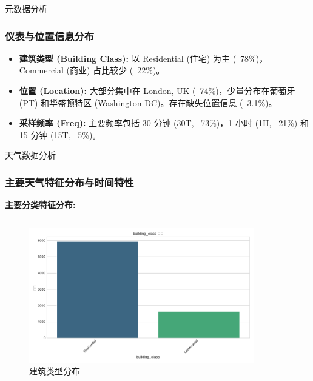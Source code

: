 \documentclass{beamer} %
\begin{document}
\begin{frame}{元数据分析}
    \frametitle{仪表与位置信息分布}
    \begin{itemize}
        \item \textbf{建筑类型 (Building Class):} 以 Residential (住宅) 为主 (~78\%)，Commercial (商业) 占比较少 (~22\%)。
        \item \textbf{位置 (Location):} 大部分集中在 London, UK (~74\%)，少量分布在葡萄牙 (PT) 和华盛顿特区 (Washington DC)。存在缺失位置信息 (~3.1\%)。
        \item \textbf{采样频率 (Freq):} 主要频率包括 30 分钟 (30T, ~73\%)，1 小时 (1H, ~21\%) 和 15 分钟 (15T, ~5\%)。
    \end{itemize}
\end{frame}

\begin{frame}{天气数据分析}
    \frametitle{主要天气特征分布与时间特性}
    \textbf{主要分类特征分布:}
    \begin{columns}
        \begin{column}{0.7\textwidth}
            \centering
            \begin{figure}
                \includegraphics[width=\textwidth]{../plots/metadata_dist_building_class.png}
                \caption{建筑类型分布}
            \end{figure}
        \end{column}
        \begin{column}{0.3\textwidth}
            \centering
            \begin{figure}

\end{figure}
\end{column}
\end{columns}
\end{frame}
\end{document}
